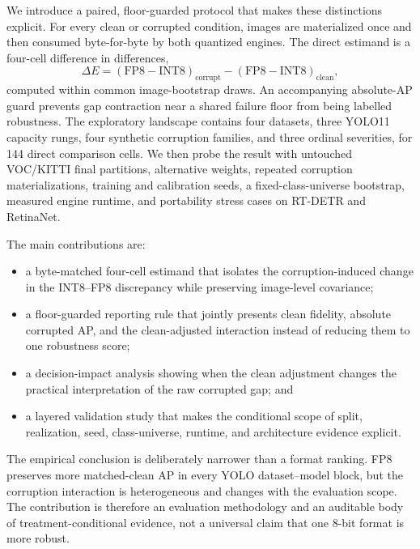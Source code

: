 We introduce a paired, floor-guarded protocol that makes these distinctions
explicit. For every clean or corrupted condition, images are materialized once
and then consumed byte-for-byte by both quantized engines. The direct estimand
is a four-cell difference in differences,
\begin{equation*}
\Delta E=
(\mathrm{FP8}-\mathrm{INT8})_{\mathrm{corrupt}}-
(\mathrm{FP8}-\mathrm{INT8})_{\mathrm{clean}},
\end{equation*}
computed within common image-bootstrap draws. An accompanying absolute-AP
guard prevents gap contraction near a shared failure floor from being labelled
robustness. The exploratory landscape contains four datasets, three YOLO11
capacity rungs, four synthetic corruption families, and three ordinal
severities, for 144 direct comparison cells. We then probe the result with
untouched VOC/KITTI final partitions, alternative weights, repeated corruption
materializations, training and calibration seeds, a fixed-class-universe
bootstrap, measured engine runtime, and portability stress cases on RT-DETR and
RetinaNet.

The main contributions are:
\begin{itemize}[leftmargin=1.45em,itemsep=2pt,topsep=3pt,parsep=0pt]
  \item a byte-matched four-cell estimand that isolates the corruption-induced
  change in the INT8--FP8 discrepancy while preserving image-level covariance;
  \item a floor-guarded reporting rule that jointly presents clean fidelity,
  absolute corrupted AP, and the clean-adjusted interaction instead of reducing
  them to one robustness score;
  \item a decision-impact analysis showing when the clean adjustment changes
  the practical interpretation of the raw corrupted gap; and
  \item a layered validation study that makes the conditional scope of split,
  realization, seed, class-universe, runtime, and architecture evidence explicit.
\end{itemize}

The empirical conclusion is deliberately narrower than a format ranking. FP8
preserves more matched-clean AP in every YOLO dataset--model block, but the
corruption interaction is heterogeneous and changes with the evaluation scope.
The contribution is therefore an evaluation methodology and an auditable body
of treatment-conditional evidence, not a universal claim that one 8-bit format
is more robust.
